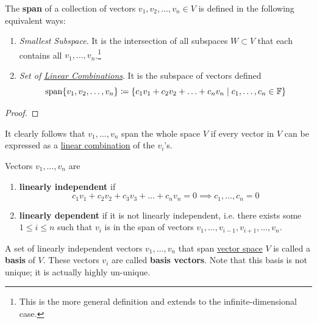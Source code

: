   \begin{definition}[Span]
    \label{def:span}
    The \textbf{span} of a collection of vectors $v_1, v_2, \ldots, v_n \in V$ is defined in the following equivalent ways: 
    \begin{enumerate}
      \item \textit{Smallest Subspace}. It is the intersection of all subspaces $W \subset V$ that each contains all $v_1, \ldots, v_n$.\footnote{This is the more general definition and extends to the infinite-dimensional case.}
      \item \textit{Set of \hyperref[def:linear-combination]{Linear Combinations}}. It is the subspace of vectors defined 
        \begin{equation}
          \operatorname{span} \{ v_1, v_2, \ldots, v_n \} \coloneqq \{ c_1 v_1 + c_2 v_2 + \ldots + c_n v_n \mid  c_1, \ldots, c_n \in \mathbb{F}\}
        \end{equation}
    \end{enumerate}
  \end{definition}
  \begin{proof}
    
  \end{proof}

  It clearly follows that $v_1, \ldots, v_n$ span the whole space $V$ if every vector in $V$ can be expressed as a \hyperref[def:linear-combination]{linear combination} of the $v_i$'s. 

  \begin{definition}
    \label{def:linear-independence}
    Vectors $v_1, \ldots, v_n$ are 
    \begin{enumerate}
      \item \textbf{linearly independent} if 
        \begin{equation}
          c_1 v_1 + c_2 v_2 + c_3 v_3 + \ldots + c_n v_n = 0 \implies c_1, \ldots, c_n = 0
        \end{equation}
      \item \textbf{linearly dependent} if it is not linearly independent, i.e. there exists some $1 \leq i \leq n$ such that $v_i$ is in the span of vectors $v_1, \ldots, v_{i-1}, v_{i+1}, \ldots, v_n$. 
    \end{enumerate}
  \end{definition}

  \begin{definition}[Basis]
    \label{def:basis}
    A set of linearly independent vectors $v_1, \ldots, v_n$ that span \hyperref[def:vector-space]{vector space} $V$ is called a \textbf{basis} of $V$. These vectors $v_i$ are called \textbf{basis vectors}. Note that this basis is not unique; it is actually highly un-unique. 
  \end{definition}

